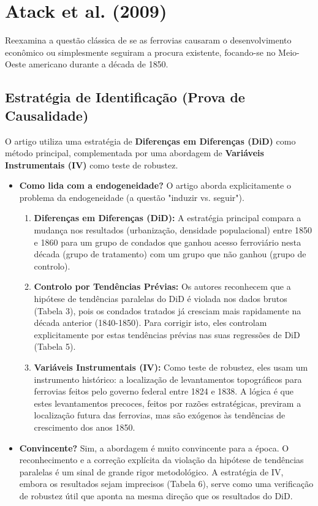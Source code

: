 \documentclass[12pt, a4paper]{article}
\begin{document}
\section{Atack et al. (2009)}
Reexamina a questão clássica de se as ferrovias causaram o desenvolvimento econômico ou simplesmente seguiram a procura existente, focando-se no Meio-Oeste americano durante a década de 1850.

\subsection{Estratégia de Identificação (Prova de Causalidade)}
O artigo utiliza uma estratégia de \textbf{Diferenças em Diferenças (DiD)} como método principal, complementada por uma abordagem de \textbf{Variáveis Instrumentais (IV)} como teste de robustez.

\begin{itemize}
    \item \textbf{Como lida com a endogeneidade?} O artigo aborda explicitamente o problema da endogeneidade (a questão "induzir vs. seguir").
        \begin{enumerate}
            \item \textbf{Diferenças em Diferenças (DiD):} A estratégia principal compara a mudança nos resultados (urbanização, densidade populacional) entre 1850 e 1860 para um grupo de condados que ganhou acesso ferroviário nesta década (grupo de tratamento) com um grupo que não ganhou (grupo de controlo).
            \item \textbf{Controlo por Tendências Prévias:} Os autores reconhecem que a hipótese de tendências paralelas do DiD é violada nos dados brutos (Tabela 3), pois os condados tratados já cresciam mais rapidamente na década anterior (1840-1850). Para corrigir isto, eles controlam explicitamente por estas tendências prévias nas suas regressões de DiD (Tabela 5).
            \item \textbf{Variáveis Instrumentais (IV):} Como teste de robustez, eles usam um instrumento histórico: a localização de levantamentos topográficos para ferrovias feitos pelo governo federal entre 1824 e 1838. A lógica é que estes levantamentos precoces, feitos por razões estratégicas, previram a localização futura das ferrovias, mas são exógenos às tendências de crescimento dos anos 1850.
        \end{enumerate}
    \item \textbf{Convincente?} Sim, a abordagem é muito convincente para a época. O reconhecimento e a correção explícita da violação da hipótese de tendências paralelas é um sinal de grande rigor metodológico. A estratégia de IV, embora os resultados sejam imprecisos (Tabela 6), serve como uma verificação de robustez útil que aponta na mesma direção que os resultados do DiD.
\end{itemize}
\end{document}
